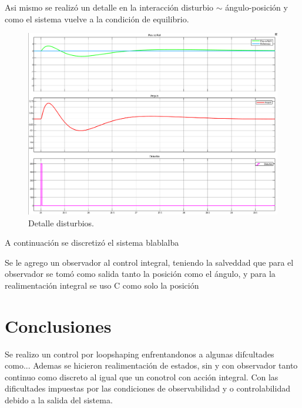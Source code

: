 Asi mismo se realizó un detalle en la interacción disturbio $\sim$ ángulo-posici\'on y como el sistema vuelve a la condici\'on de equilibrio.
\begin{figure}[H]
	\centering
	\includegraphics[width=1\linewidth]{Imagenes/Control_por_realimentacion_integral/detalle_disturbio.png}
	\caption{Detalle disturbios.}
	\label{realmentacion_disturbio}
\end{figure}

A continuaci\'on se discretiz\'o el sistema
blablalba


Se le agrego un observador al control integral, teniendo la salveddad que para el observador se tom\'o como salida tanto la posici\'on como el \'angulo, y para la realimentaci\'on integral se uso C como solo la posici\'on

\section{Conclusiones}
Se realizo un control por loopshaping enfrentandonos a algunas difcultades como...
Ademas se hicieron realimentación de estados, sin y con observador tanto continuo como discreto al igual que un conotrol con acción integral.
Con las dificultades impuestas por las condiciones de observabilidad y o controlabilidad debido a la salida del sistema.

